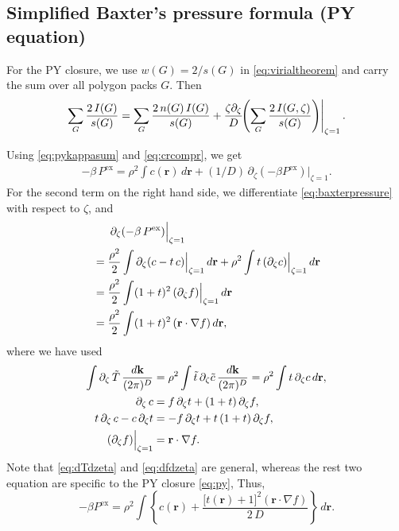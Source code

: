 \documentclass[aip,jcp,reprint,superscriptaddress]{revtex4-1}
\newcommand{\vct}[1]{\mathbf{#1}}
\providecommand{\vr}{} %
\renewcommand{\vr}{\vct{r}}
\newcommand{\vk}{\vct{k}}
\newcommand{\dvk}{\frac{d\vk}{(2\pi)^D}}
\newcommand{\supex}[1]{ { { #1 }^{ \mathrm{ex} } } }
\newcommand{\Pex}{\supex{P}}
\begin{document}
\subsection{\label{sec:vtpy}Simplified Baxter's pressure formula (PY equation)}



For the PY closure, we use $w(G) = 2/s(G)$
in \eqref{eq:virialtheorem}
and carry the sum over all polygon packs $G$.
%
Then
%
\begin{align*}
  \sum_G \frac{ 2 \, I(G) } { s(G) }
  =
  \sum_G \frac{ 2 \, n(G) \, I(G) } { s(G) }
  + \frac{ \zeta \partial_\zeta }{ D }
    \mkern-8mu \left. \left(
    \sum_G \frac{ 2 \, I(G, \zeta) } { s(G) }
    \right) \right|_{\zeta = 1}.
\end{align*}


Using \eqref{eq:pykappasum} and \eqref{eq:crcompr}, we get
\begin{align}
  -\beta \, \Pex
  =
  \rho^2 \int c(\vr) \, d\vr
  + (1/D) \,
      \partial_\zeta \left( -\beta \Pex \right)
    \Big|_{\zeta = 1}.
\label{eq:pyPsimp1}
\end{align}
%
For the second term on the right hand side,
we differentiate \eqref{eq:baxterpressure} with respect to $\zeta$,
and
\begin{align*}
&\hphantom{==}
\partial_\zeta (-\beta \, \Pex) \Big|_{\zeta=1}
\\
&=
\frac{\rho^2}{2}
\int
  \partial_\zeta (c - t \, c)
  \Big|_{\zeta = 1} \, d\vr
+ \rho^2 \int t \, (\partial_\zeta c) \Big|_{\zeta = 1} \, d\vr
\\
&=
\frac{\rho^2}{2}
\int (1+t)^2 \, (\partial_\zeta f) \Big|_{\zeta = 1} \, d\vr
\\
&=
\frac{\rho^2}{2}
\int (1+t)^2 \, (\vr \cdot \nabla f) \, d\vr,
\end{align*}
%
where we have used
\begin{align}
%
\int \partial_\zeta \, \tilde T \, \dvk
&=
  \rho^2 \int \tilde{t} \, \partial_\zeta \tilde{c} \, \dvk
=
  \rho^2 \int t \, \partial_\zeta c \, d\vr,
  \label{eq:dTdzeta} \\
%
  \partial_\zeta \, c
&=
  f \, \partial_\zeta t
  + (1 + t) \, \partial_\zeta f,
  \notag \\
%
  t \, \partial_\zeta \, c - c \, \partial_\zeta t
&=
  -f \, \partial_\zeta t
  + t \, (1 + t) \, \partial_\zeta f,
  \notag \\
%
  (\partial_\zeta f) \Big|_{\zeta = 1}
&= \vr \cdot \nabla f.
  \label{eq:dfdzeta}
\end{align}
%
Note that \eqref{eq:dTdzeta} and \eqref{eq:dfdzeta} are general,
whereas the rest two equation are specific to the PY closure \eqref{eq:py},
%
Thus,
\begin{equation}
  -\beta \Pex = \rho^2 \int
  \left\{ c(\vr)
    + \frac{ \big[ t(\vr) + 1 \big]^2 (\vr \cdot \nabla f) }
           { 2 \, D }
  \right\} \, d\vr.
  \label{eq:pyPsimplified}
\end{equation}
\end{document}
